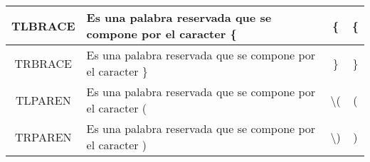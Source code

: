 \documentclass[12pt,a4paper,landscape]{article}
\theoremstyle{mytheor}
\begin{document}
\begin{longtable}[c]{|c|c|c|c|}
TLBRACE      & \multicolumn{1}{l|}{Es una palabra reservada que se compone por el caracter \{}                                                                                                                                                                                                                                                                                                                             & \{                                                                  & \{                                                                                                                                                                                                                                               \\ \hline
TRBRACE      & \multicolumn{1}{l|}{Es una palabra reservada que se compone por el caracter \}}                                                                                                                                                                                                                                                                                                                             & \}                                                                  & \}                                                                                                                                                                                                                                               \\ \hline
TLPAREN      & \multicolumn{1}{l|}{Es una palabra reservada que se compone por el caracter (}                                                                                                                                                                                                                                                                                                                              & \textbackslash{}(                                                   & (                                                                                                                                                                                                                                                \\ \hline
TRPAREN      & \multicolumn{1}{l|}{Es una palabra reservada que se compone por el caracter )}                                                                                                                                                                                                                                                                                                                              & \textbackslash{})                                                   & )                                                                                                                                                                                                                                                \\ \hline

\end{longtable}
\end{document}
